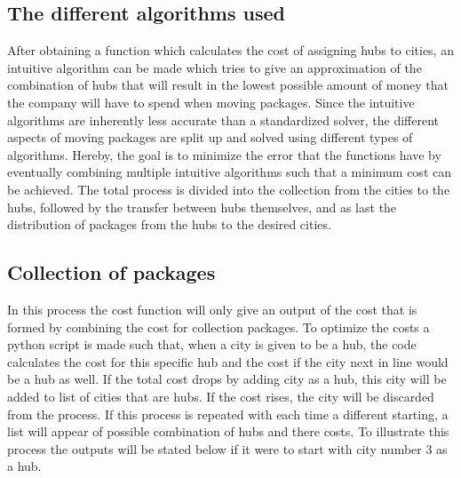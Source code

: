 \documentclass{article}
\begin{document}
        
    \subsection{The different algorithms used}
    
    After obtaining a function which calculates the cost of assigning hubs to cities, an intuitive algorithm can be made which tries to give an approximation of the combination of hubs that will result in the lowest possible amount of money that the company will have to spend when moving packages. 
    Since the intuitive algorithms are inherently less accurate than a standardized solver, the different aspects of moving packages are split up and solved using different types of algorithms. Hereby, the goal is to minimize the error that the functions have by eventually combining multiple intuitive algorithms such that a minimum cost can be achieved. The total process is divided into the collection from the cities to the hubs, followed by the transfer between hubs themselves, and as last the distribution of packages from the hubs to the desired cities. 
    
\subsection{Collection of packages}    

In this process the cost function will only give an output of the cost that is formed by combining the cost for collection packages.
To optimize the costs a python script is made such that, when a city is given to be a hub, the code calculates the cost for this specific hub and the cost if the city next in line would be a hub as well. If the total cost drops by adding city as a hub, this city will be added to list of cities that are hubs. If the cost rises, the city will be discarded from the process. If this process is repeated with each time a different starting, a list will appear of possible combination of hubs and there costs. To illustrate this process the outputs will be stated below if it were to start with city number 3 as a hub.
\end{document}
